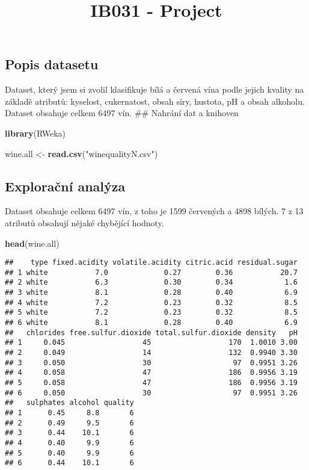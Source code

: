 \documentclass[]{article}
\title{IB031 - Project}
\author{}
\date{}
\newenvironment{Shaded}{\begin{snugshade}}{\end{snugshade}}
\newcommand{\KeywordTok}[1]{\textcolor[rgb]{0.13,0.29,0.53}{\textbf{#1}}}
\newcommand{\NormalTok}[1]{#1}
\newcommand{\StringTok}[1]{\textcolor[rgb]{0.31,0.60,0.02}{#1}}
\begin{document}
\maketitle

\hypertarget{popis-datasetu}{%
\subsection{Popis datasetu}\label{popis-datasetu}}

Dataset, který jsem si zvolil klasifikuje bílá a červená vína podle
jejich kvality na základě atributů: kyselost, cukernatost, obsah síry,
hustota, pH a obsah alkoholu. Dataset obsahuje celkem 6497 vín. \#\#
Nahrání dat a knihoven

\begin{Shaded}
\begin{Highlighting}[]
\KeywordTok{library}\NormalTok{(RWeka)}

\NormalTok{wine.all <-}\StringTok{ }\KeywordTok{read.csv}\NormalTok{(}\StringTok{"winequalityN.csv"}\NormalTok{)}
\end{Highlighting}
\end{Shaded}

\hypertarget{exploracni-analyza}{%
\subsection{Explorační analýza}\label{exploracni-analyza}}

Dataset obsahuje celkem 6497 vín, z toho je 1599 červených a 4898
bílých. 7 z 13 atributů obsahují nějaké chybějící hodnoty.

\begin{Shaded}
\begin{Highlighting}[]
\KeywordTok{head}\NormalTok{(wine.all)}
\end{Highlighting}
\end{Shaded}

\begin{verbatim}
##    type fixed.acidity volatile.acidity citric.acid residual.sugar
## 1 white           7.0             0.27        0.36           20.7
## 2 white           6.3             0.30        0.34            1.6
## 3 white           8.1             0.28        0.40            6.9
## 4 white           7.2             0.23        0.32            8.5
## 5 white           7.2             0.23        0.32            8.5
## 6 white           8.1             0.28        0.40            6.9
##   chlorides free.sulfur.dioxide total.sulfur.dioxide density   pH
## 1     0.045                  45                  170  1.0010 3.00
## 2     0.049                  14                  132  0.9940 3.30
## 3     0.050                  30                   97  0.9951 3.26
## 4     0.058                  47                  186  0.9956 3.19
## 5     0.058                  47                  186  0.9956 3.19
## 6     0.050                  30                   97  0.9951 3.26
##   sulphates alcohol quality
## 1      0.45     8.8       6
## 2      0.49     9.5       6
## 3      0.44    10.1       6
## 4      0.40     9.9       6
## 5      0.40     9.9       6
## 6      0.44    10.1       6
\end{verbatim}
\end{document}
